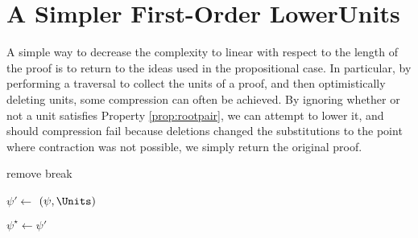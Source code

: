 
\section{A Simpler First-Order LowerUnits}
\label{sec:SimpleFOLU}

%

A simple way to decrease the complexity to linear with respect to the length of the proof is to return to the ideas used in the propositional case. In particular, by performing a traversal to collect the units of a proof, and then optimistically deleting units, some compression can often be achieved. By ignoring whether or not a unit satisfies Property \ref{prop:rootpair}, we can attempt to lower it, and should compression fail because deletions changed the substitutions to the point where contraction was not possible, we simply return the original proof. 

\begin{algorithm}[bt]
  \SetAlgoVlined
  \SetAlgoShortEnd
{}
  \BlankLine


   {remove}
   {break}

  \BlankLine

  \BlankLine

    $\psi' \leftarrow $ $(\psi,\Units)$ \;
    \BlankLine

    

    $\psi^{\star} \leftarrow \psi'$ \;
  
    

  \caption{\SFOLowerUnits}
  \label{algo:simpleFOLU}
\end{algorithm}

